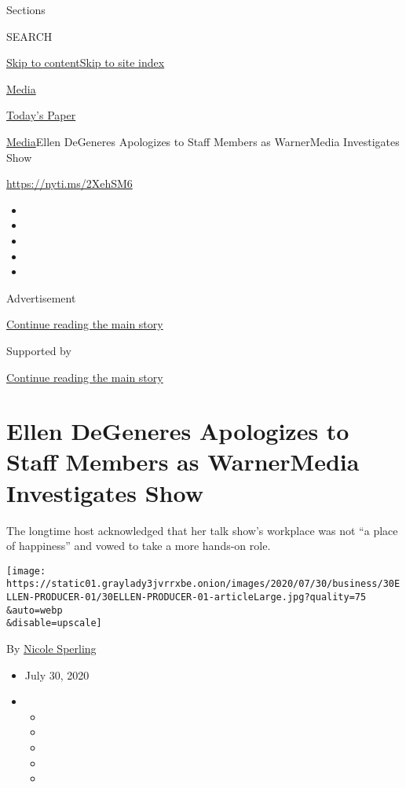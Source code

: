 Sections

SEARCH

\protect\hyperlink{site-content}{Skip to
content}\protect\hyperlink{site-index}{Skip to site index}

\href{https://www.nytimes3xbfgragh.onion/section/business/media}{Media}

\href{https://myaccount.nytimes3xbfgragh.onion/auth/login?response_type=cookie\&client_id=vi}{}

\href{https://www.nytimes3xbfgragh.onion/section/todayspaper}{Today's
Paper}

\href{/section/business/media}{Media}\textbar{}Ellen DeGeneres
Apologizes to Staff Members as WarnerMedia Investigates Show

\url{https://nyti.ms/2XehSM6}

\begin{itemize}
\item
\item
\item
\item
\item
\end{itemize}

Advertisement

\protect\hyperlink{after-top}{Continue reading the main story}

Supported by

\protect\hyperlink{after-sponsor}{Continue reading the main story}

\hypertarget{ellen-degeneres-apologizes-to-staff-members-as-warnermedia-investigates-show}{%
\section{Ellen DeGeneres Apologizes to Staff Members as WarnerMedia
Investigates
Show}\label{ellen-degeneres-apologizes-to-staff-members-as-warnermedia-investigates-show}}

The longtime host acknowledged that her talk show's workplace was not
``a place of happiness'' and vowed to take a more hands-on role.

\texttt{[image: https://static01.graylady3jvrrxbe.onion/images/2020/07/30/business/30ELLEN-PRODUCER-01/30ELLEN-PRODUCER-01-articleLarge.jpg?quality=75\\\&auto=webp\\\&disable=upscale]}

By \href{https://www.nytimes3xbfgragh.onion/by/nicole-sperling}{Nicole
Sperling}

\begin{itemize}
\item
  July 30, 2020
\item
  \begin{itemize}
  \item
  \item
  \item
  \item
  \item
  \end{itemize}
\end{itemize}

